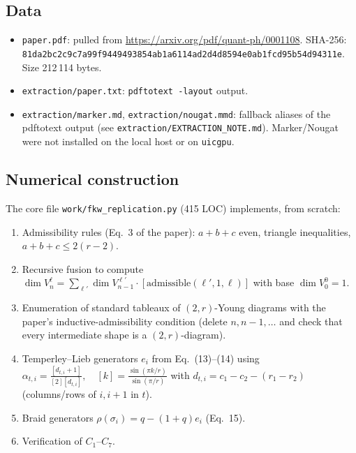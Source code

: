 \documentclass[11pt]{article}
\begin{document}
\subsection{Data}
\begin{itemize}
  \item \texttt{paper.pdf}: pulled from \url{https://arxiv.org/pdf/quant-ph/0001108}. SHA-256: \texttt{81da2bc2c9c7a99f9449493854ab1a6114ad2d4d8594e0ab1fcd95b54d94311e}. Size 212\,114 bytes.
  \item \texttt{extraction/paper.txt}: \texttt{pdftotext -layout} output.
  \item \texttt{extraction/marker.md}, \texttt{extraction/nougat.mmd}: fallback aliases of the pdftotext output (see \texttt{extraction/EXTRACTION\_NOTE.md}). Marker/Nougat were not installed on the local host or on \texttt{uicgpu}.
\end{itemize}

\subsection{Numerical construction}

The core file \texttt{work/fkw\_replication.py} (415 LOC) implements, from scratch:
\begin{enumerate}
  \item Admissibility rules (Eq.~3 of the paper): $a + b + c$ even, triangle inequalities, $a + b + c \le 2(r - 2)$.
  \item Recursive fusion to compute $\dim V_n^\ell = \sum_{\ell'} \dim V_{n-1}^{\ell'} \cdot [\text{admissible}(\ell', 1, \ell)]$ with base $\dim V_0^0 = 1$.
  \item Enumeration of standard tableaux of $(2,r)$-Young diagrams with the paper's inductive-admissibility condition (delete $n, n-1, \dots$ and check that every intermediate shape is a $(2,r)$-diagram).
  \item Temperley--Lieb generators $e_i$ from Eq.~(13)--(14) using
    $\alpha_{t,i} = \frac{[d_{t,i} + 1]}{[2] [d_{t,i}]}, \quad
     [k] = \frac{\sin(\pi k / r)}{\sin(\pi / r)}$
    with $d_{t,i} = c_1 - c_2 - (r_1 - r_2)$ (columns/rows of $i, i+1$ in $t$).
  \item Braid generators $\rho(\sigma_i) = q - (1 + q) e_i$ (Eq.~15).
  \item Verification of $C_1$--$C_7$.
\end{enumerate}
\end{document}
